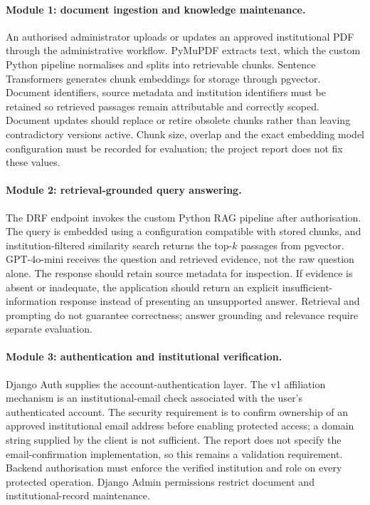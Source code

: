 \documentclass{tietreport}
\begin{document}
\paragraph{Module 1: document ingestion and knowledge maintenance.}
An authorised administrator uploads or updates an approved institutional
PDF through the administrative workflow. PyMuPDF extracts text, which the
custom Python pipeline normalises and splits into retrievable chunks.
Sentence Transformers generates chunk embeddings for storage through pgvector.
Document identifiers, source metadata and institution identifiers must be
retained so retrieved passages remain attributable and correctly scoped.
Document updates should replace or retire obsolete chunks rather than leaving
contradictory versions active. Chunk size, overlap and the exact embedding
model configuration must be recorded for evaluation; the project report does
not fix these values.

\paragraph{Module 2: retrieval-grounded query answering.}
The DRF endpoint invokes the custom Python RAG pipeline after authorisation.
The query is embedded using a configuration compatible with stored chunks,
and institution-filtered similarity search returns the top-$k$ passages from
pgvector. GPT-4o-mini receives the question and retrieved evidence, not the
raw question alone. The response should retain source metadata for inspection.
If evidence is absent or inadequate, the application should return an explicit
insufficient-information response instead of presenting an unsupported answer.
Retrieval and prompting do not guarantee correctness; answer grounding and
relevance require separate evaluation.

\paragraph{Module 3: authentication and institutional verification.}
Django Auth supplies the account-authentication layer. The v1 affiliation
mechanism is an institutional-email check associated with the user's
authenticated account. The security requirement is to
confirm ownership of an approved institutional email address before enabling
protected access; a domain string supplied by the client is not sufficient.
The report does not specify the email-confirmation implementation, so this
remains a validation requirement. Backend authorisation must enforce the
verified institution and role on every protected operation. Django Admin
permissions restrict document and institutional-record maintenance.
\end{document}
